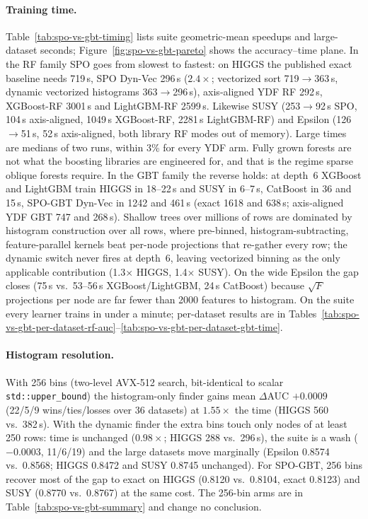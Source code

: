 \paragraph{Training time.}
Table~\ref{tab:spo-vs-gbt-timing} lists suite geometric-mean speedups and large-dataset
seconds; Figure~\ref{fig:spo-vs-gbt-pareto} shows the accuracy--time plane. In the RF family
SPO goes from slowest to fastest: on HIGGS the published exact baseline needs 719\,s, SPO
Dyn-Vec 296\,s ($2.4\times$; vectorized sort 719$\to$363\,s, dynamic vectorized histograms
363$\to$296\,s), axis-aligned YDF RF 292\,s, XGBoost-RF 3001\,s and LightGBM-RF 2599\,s.
Likewise SUSY (253$\to$92\,s SPO, 104\,s axis-aligned, 1049\,s XGBoost-RF, 2281\,s LightGBM-RF)
and Epsilon (126$\to$51\,s, 52\,s axis-aligned, both library RF modes out of memory). Large
times are medians of two runs, within 3\% for every YDF arm. Fully grown forests are not what
the boosting libraries are engineered for, and that is the regime sparse oblique forests
require. In the GBT family the reverse holds: at depth~6 XGBoost and LightGBM train HIGGS in
18--22\,s and SUSY in 6--7\,s, CatBoost in 36 and 15\,s, SPO-GBT Dyn-Vec in 1242 and 461\,s
(exact 1618 and 638\,s; axis-aligned YDF GBT 747 and 268\,s). Shallow trees over millions of
rows are dominated by histogram construction over all rows, where pre-binned,
histogram-subtracting, feature-parallel kernels beat per-node projections that re-gather every
row; the dynamic switch never fires at depth~6, leaving vectorized binning as the only
applicable contribution (1.3$\times$ HIGGS, 1.4$\times$ SUSY). On the wide Epsilon the gap
closes (75\,s vs.\ 53--56\,s XGBoost/LightGBM, 24\,s CatBoost) because $\sqrt{F}$ projections
per node are far fewer than 2000 features to histogram. On the suite every learner trains in
under a minute; per-dataset results are in
Tables~\ref{tab:spo-vs-gbt-per-dataset-rf-auc}--\ref{tab:spo-vs-gbt-per-dataset-gbt-time}.

\paragraph{Histogram resolution.}
With 256 bins (two-level AVX-512 search, bit-identical to scalar \texttt{std::upper\_bound})
the histogram-only finder gains mean $\Delta$AUC $+0.0009$ (22/5/9 wins/ties/losses over 36
datasets) at $1.55\times$ the time (HIGGS 560 vs.\ 382\,s). With the dynamic finder the extra
bins touch only nodes of at least 250 rows: time is unchanged ($0.98\times$; HIGGS 288 vs.\
296\,s), the suite is a wash ($-0.0003$, 11/6/19) and the large datasets move marginally
(Epsilon 0.8574 vs.\ 0.8568; HIGGS 0.8472 and SUSY 0.8745 unchanged). For SPO-GBT, 256 bins
recover most of the gap to exact on HIGGS (0.8120 vs.\ 0.8104, exact 0.8123) and SUSY (0.8770
vs.\ 0.8767) at the same cost. The 256-bin arms are in Table~\ref{tab:spo-vs-gbt-summary} and
change no conclusion.

